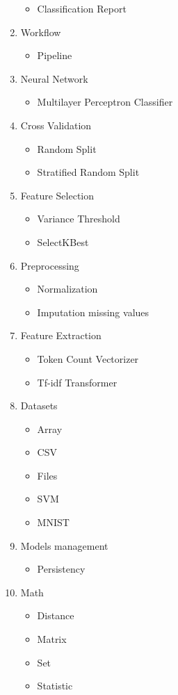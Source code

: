 \begin{enumerate}
\begin{itemize}
\item  Classification Report
\end{itemize}
\item Workflow
\begin{itemize}
\item  Pipeline
\end{itemize}
\item Neural Network
\begin{itemize}
\item Multilayer Perceptron Classifier
\end{itemize}
\item Cross Validation
\begin{itemize}
\item Random Split
\item Stratified Random Split
\end{itemize}
\item Feature Selection
\begin{itemize}
\item Variance Threshold
\item SelectKBest
\end{itemize}
\item Preprocessing
\begin{itemize}
\item Normalization
\item Imputation missing values
\end{itemize}
\item Feature Extraction
\begin{itemize}
\item Token Count Vectorizer
\item Tf-idf Transformer
\end{itemize}
\item Datasets
\begin{itemize}
\item Array
\item CSV
\item Files
\item SVM
\item MNIST
\end{itemize}
\item Models management
\begin{itemize}
\item Persistency
\end{itemize}
\item Math
\begin{itemize}
\item Distance
\item Matrix
\item Set
\item Statistic
\end{itemize}
\end{enumerate}


